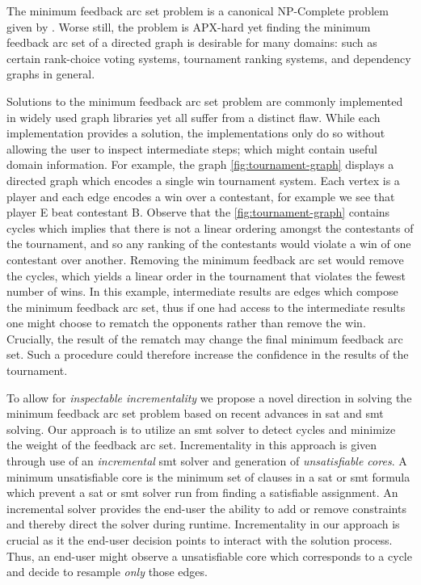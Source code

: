 \label{section:introduction}%

The minimum feedback arc set problem is a canonical NP-Complete problem given
by \citet{KarpNPComplete}. Worse still, the problem is
APX-hard yet finding the minimum feedback arc set
of a directed graph is desirable for many domains: such as certain rank-choice
voting systems, tournament ranking systems, and dependency graphs in
general.

Solutions to the minimum feedback arc set problem are commonly implemented in
widely used graph libraries yet all suffer from a distinct flaw. While each
implementation provides a solution, the implementations only do so without
allowing the user to inspect intermediate steps; which might contain useful
domain information. For example, the graph \autoref{fig:tournament-graph}
displays a directed graph which encodes a single win tournament system. Each
vertex is a player and each edge encodes a win over a contestant, for example we
see that player E beat contestant B. Observe that the
\autoref{fig:tournament-graph} contains cycles which implies that there is not a
linear ordering amongst the contestants of the tournament, and so any ranking of
the contestants would violate a win of one contestant over another. Removing the
minimum feedback arc set would remove the cycles, which yields a linear order in
the tournament that violates the fewest number of wins. In this example,
intermediate results are edges which compose the minimum feedback arc set, thus
if one had access to the intermediate results one might choose to rematch the
opponents rather than remove the win. Crucially, the result of the rematch may
change the final minimum feedback arc set. Such a procedure could therefore
increase the confidence in the results of the tournament.

To allow for \emph{inspectable incrementality} we propose a novel direction in solving the minimum feedback arc set problem based on
recent advances in \ac{sat} and \ac{smt} solving. Our approach is to utilize an
\ac{smt} solver to detect cycles and minimize the weight of the feedback arc
set. Incrementality in this approach is given through use of an
\emph{incremental} \ac{smt} solver and generation of \emph{unsatisfiable cores}.
A minimum unsatisfiable core is the minimum set of clauses in a \ac{sat} or
\ac{smt} formula which prevent a \ac{sat} or \ac{smt} solver run from finding a
satisfiable assignment. An incremental solver provides the end-user the ability
to add or remove constraints and thereby direct the solver during runtime.
Incrementality in our approach is crucial as it the end-user decision points to
interact with the solution process. Thus, an end-user might observe a
unsatisfiable core which corresponds to a cycle and decide to resample
\emph{only} those edges.

